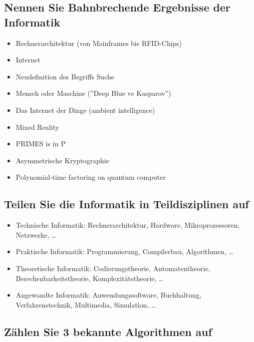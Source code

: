 \subsection{Nennen Sie Bahnbrechende Ergebnisse der Informatik}

\begin{itemize}
  \item Rechnerarchitektur (von Mainframes bis RFID-Chips)
  \item Internet
  \item Neudefinition des Begriffs Suche
  \item Mensch oder Maschine (''Deep Blue vs Kasparov'')
  \item Das Internet der Dinge (ambient intelligence)
  \item Mixed Reality
  \item PRIMES is in P
  \item Asymmetrische Kryptographie
  \item Polynomial-time factoring on quantum computer
\end{itemize}

\subsection{Teilen Sie die Informatik in Teildisziplinen auf}

\begin{itemize}
  \item Technische Informatik: Rechnerarchitektur, Hardware,
    Mikroprozessoren, Netzwerke, \dots
  \item Praktische Informatik: Programmierung, Compilerbau, Algorithmen,
    \dots
  \item Theoretische Informatik: Codierungstheorie, Automatentheorie,
    Berechenbarkeitstheorie, Komplexitätstheorie, \dots
  \item Angewandte Informatik: Anwendungssoftware, Buchhaltung,
    Verfahrenstechnik, Multimedia, Simulation, \dots
\end{itemize}

\subsection{Zählen Sie 3 bekannte Algorithmen auf}

